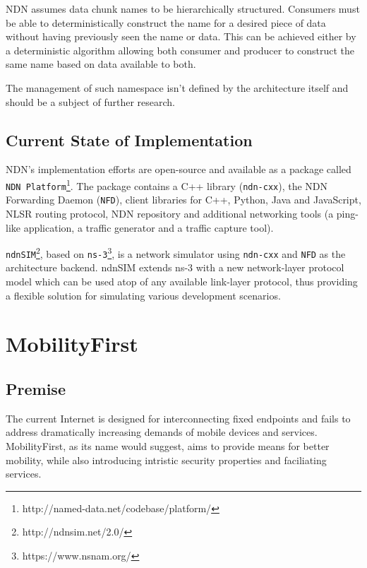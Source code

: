                 NDN assumes data chunk names to be hierarchically structured. Consumers must be able to deterministically construct the name for a desired piece of data without having previously seen the name or data. This can be achieved either by a deterministic algorithm allowing both consumer and producer to construct the same name based on data available to both.

                The management of such namespace isn't defined by the architecture itself and should be a subject of further research.

        \subsection{Current State of Implementation}

            NDN's implementation efforts are open-source and available as a package called \texttt{NDN Platform}\footnote{http://named-data.net/codebase/platform/}. The package contains a C++ library (\texttt{ndn-cxx}), the NDN Forwarding Daemon (\texttt{NFD}), client libraries for C++, Python, Java and JavaScript, NLSR routing protocol, NDN repository and additional networking tools (a ping-like application, a traffic generator and a traffic capture tool).

            \texttt{ndnSIM}\footnote{http://ndnsim.net/2.0/}, based on \texttt{ns-3}\footnote{https://www.nsnam.org/}, is a network simulator using \texttt{ndn-cxx} and \texttt{NFD} as the architecture backend. ndnSIM extends ns-3 with a new network-layer protocol model which can be used atop of any available link-layer protocol, thus providing a flexible solution for simulating various development scenarios.


    \section{MobilityFirst}\label{archs:mf}

        \subsection{Premise}

            The current Internet is designed for interconnecting fixed endpoints and fails to address dramatically increasing demands of mobile devices and services. MobilityFirst, as its name would suggest, aims to provide means for better mobility, while also introducing intristic security properties and faciliating services.

